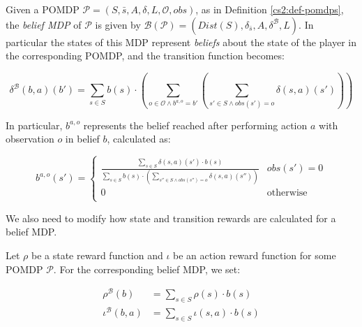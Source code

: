 \begin{definition}
    \label{cs2:belief_mdps}

    Given a POMDP $\mathcal{P} = (S, \bar{s}, A, \delta, L, \mathcal{O}, obs)$, as in Definition \ref{cs2:def-pomdps}, the \emph{belief MDP} of $\mathcal{P}$ is given by $\mathcal{B}(\mathcal{P}) = (Dist(S), \delta_{\bar{s}}, A, \delta^\mathcal{B}, L)$. In particular the states of this MDP represent \emph{beliefs} about the state of the player in the corresponding POMDP, and the transition function becomes:

    \begin{equation*}
        \delta^{\mathcal{B}}(b, a)(b') = \sum_{s \in S} b(s) \cdot \left( \sum_{o \in \mathcal{O} \wedge b^{a,o} = b'} \left(  \sum_{s' \in S \wedge obs(s')=o} \delta(s, a)(s') \right) \right)
    \end{equation*}

    In particular, $b^{a, o}$ represents the belief reached after performing action $a$ with observation $o$ in belief $b$, calculated as:

    \begin{equation*}
        b^{a, o}(s') =
        \begin{cases}
            \frac{\displaystyle \mbox{$\sum\nolimits_{s \in S}$} \delta(s, a)(s') \cdot b(s)}{\displaystyle \mbox{$\sum\nolimits_{s \in S}$} b(s) \cdot \left(\mbox{$\sum_{s'' \in S \wedge obs(s'')=o}$} \delta(s,a)(s'')\right)} & obs(s') = 0 \\ 0 & \text{otherwise} \\
        \end{cases}
    \end{equation*}

\end{definition}

We also need to modify how state and transition rewards are calculated for a belief MDP.

\begin{definition}
    \label{cs2:belief_rewards}
    Let $\rho$ be a state reward function and $\iota$ be an action reward function for some POMDP $\mathcal{P}$. For the corresponding belief MDP, we set:

    \begin{align*}
        \rho^{\mathcal{B}}(b) &= \sum_{s \in S} \rho(s) \cdot b(s) \\
        \iota^{\mathcal{B}}(b, a) &= \sum_{s \in S} \iota(s, a) \cdot b(s) \\ 
    \end{align*}

\end{definition}

